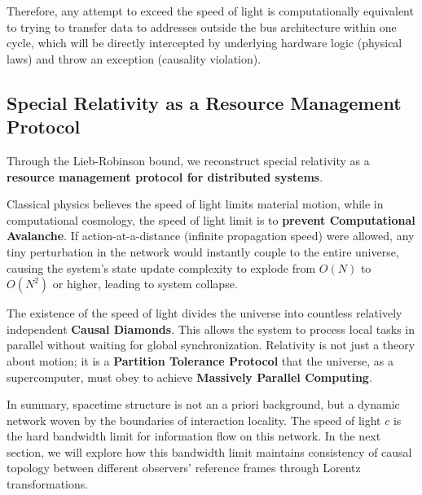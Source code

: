 Therefore, any attempt to exceed the speed of light is computationally equivalent to trying to transfer data to addresses outside the bus architecture within one cycle, which will be directly intercepted by underlying hardware logic (physical laws) and throw an exception (causality violation).

\subsection{Special Relativity as a Resource Management Protocol}

Through the Lieb-Robinson bound, we reconstruct special relativity as a \textbf{resource management protocol for distributed systems}.

Classical physics believes the speed of light limits material motion, while in computational cosmology, the speed of light limit is to \textbf{prevent Computational Avalanche}. If action-at-a-distance (infinite propagation speed) were allowed, any tiny perturbation in the network would instantly couple to the entire universe, causing the system's state update complexity to explode from $O(N)$ to $O(N^2)$ or higher, leading to system collapse.

\begin{corollary}
The existence of the speed of light divides the universe into countless relatively independent \textbf{Causal Diamonds}. This allows the system to process local tasks in parallel without waiting for global synchronization. Relativity is not just a theory about motion; it is a \textbf{Partition Tolerance Protocol} that the universe, as a supercomputer, must obey to achieve \textbf{Massively Parallel Computing}.
\end{corollary}

In summary, spacetime structure is not an a priori background, but a dynamic network woven by the boundaries of interaction locality. The speed of light $c$ is the hard bandwidth limit for information flow on this network. In the next section, we will explore how this bandwidth limit maintains consistency of causal topology between different observers' reference frames through Lorentz transformations.
